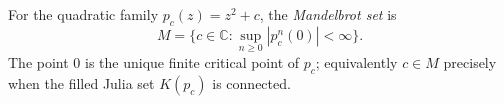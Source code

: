 
For the quadratic family $p_c(z)=z^2+c$, the \emph{Mandelbrot set} is
\[
M=\{c\in\mathbb C:\sup_{n\ge0}|p_c^n(0)|<\infty\}.
\]
The point $0$ is the unique finite critical point of $p_c$; equivalently $c\in M$ precisely when the filled Julia set $K(p_c)$ is connected.
